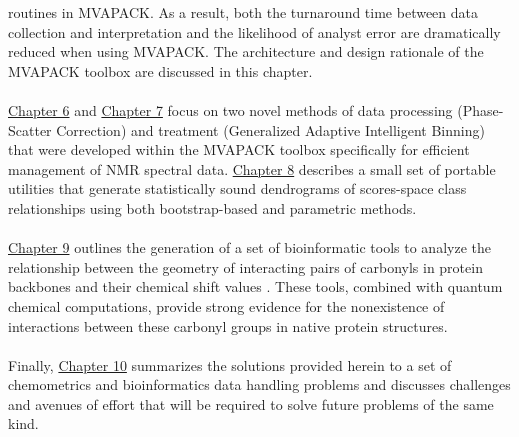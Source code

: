 \begin{doublespace}
routines in MVAPACK. As a result, both the turnaround time between data
collection and interpretation and the likelihood of analyst error are
dramatically reduced when using MVAPACK. The architecture and design rationale
of the MVAPACK toolbox are discussed in this chapter.
\\\\
\hyperlink{chapter.6}{Chapter 6} and \hyperlink{chapter.7}{Chapter 7} focus on
two novel methods of data processing (Phase-Scatter Correction) and treatment
(Generalized Adaptive Intelligent Binning) that were developed within the
MVAPACK toolbox specifically for efficient management of NMR spectral data.
\hyperlink{chapter.8}{Chapter 8} describes a small set of portable utilities
that generate statistically sound dendrograms of scores-space class
relationships using both bootstrap-based and parametric methods.
\\\\
\hyperlink{chapter.9}{Chapter 9} outlines the generation of a set of
bioinformatic tools to analyze the relationship between the geometry of
interacting pairs of carbonyls in protein backbones and their \cnmr{} chemical
shift values \cite{worley:pone2012}. These tools, combined with quantum
chemical computations, provide strong evidence for the nonexistence of
\npistar{} interactions between these carbonyl groups in native protein
structures.
\\\\
Finally, \hyperlink{chapter.10}{Chapter 10} summarizes the solutions provided
herein to a set of chemometrics and bioinformatics data handling problems and
discusses challenges and avenues of effort that will be required to solve
future problems of the same kind.
\end{doublespace}





